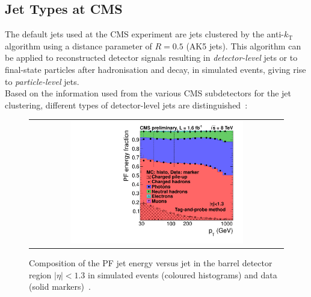 \subsection{Jet Types at CMS}
\label{subsec:jets_types}
The default jets used at the CMS experiment are jets clustered by the anti-$k_\mathrm{T}$ algorithm using a distance parameter of $R = 0.5$ (AK5 jets). This algorithm can be applied to reconstructed detector signals resulting in \textit{detector-level} jets or to final-state particles after hadronisation and decay, in simulated events, giving rise to \textit{particle-level} jets.  \\
Based on the information used from the various CMS subdetectors for the jet clustering, different types of detector-level jets are distinguished~\cite{1748-0221-6-11-P11002}:
\begin{figure}[!tp]
  \centering 
  \begin{tabular}{c}
    \includegraphics[width=0.7\textwidth]{figures/calcFrac_Frac0_MC-1.pdf} 
  \end{tabular}
  \caption{Composition of the PF jet energy versus jet \pt in the barrel detector region $|\eta| < 1.3$ in simulated events (coloured histograms) and data (solid markers)~\cite{CMS-DP-2012-012}.}
  \label{fig:jets_pf_comp}
\end{figure}
